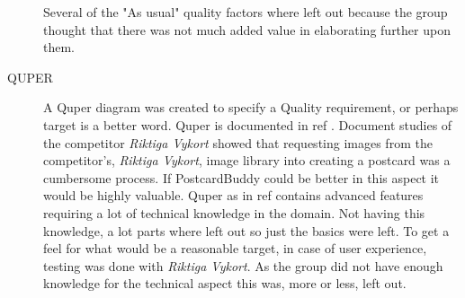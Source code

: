 \documentclass[10pt,a4paper]{article}
\begin{document}
\begin{description}
Several of the "As usual" quality factors where left out because the group thought that there was not much added value in elaborating further upon them.

\item[QUPER]
A Quper diagram was created to specify a Quality requirement, or perhaps target is a better word. Quper is documented in ref \cite{soren}. Document studies of the competitor \textit{Riktiga Vykort} showed that requesting images from the competitor's, \textit{Riktiga Vykort}, image library into creating a postcard was a cumbersome process. If PostcardBuddy could be better in this aspect it would be highly valuable. Quper as in ref \cite{soren} contains advanced features requiring a lot of technical knowledge in the domain. Not having this knowledge, a lot parts where left out so just the basics were left. To get a feel for what would be a reasonable target, in case of user experience, testing was done with \textit{Riktiga Vykort}. As the group did not have enough knowledge for the technical aspect this was, more or less, left out.
\end{description}

\end{document}
